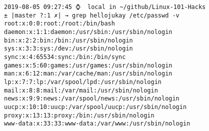 \documentclass[UTF8]{ctexart}
\begin{document}
\begin{lstlisting}
2019-08-05 09:27:45 ⌚  local in ~/github/Linux-101-Hacks                                                                                                                    
± |master ?:1 ✗| → grep hellojukay /etc/passwd -v                                                                                                                             
root:x:0:0:root:/root:/bin/bash                                                                                                                                               
daemon:x:1:1:daemon:/usr/sbin:/usr/sbin/nologin                                                                                                                               
bin:x:2:2:bin:/bin:/usr/sbin/nologin                                                                                                                                          
sys:x:3:3:sys:/dev:/usr/sbin/nologin                                                                                                                                          
sync:x:4:65534:sync:/bin:/bin/sync                                                                                                                                            
games:x:5:60:games:/usr/games:/usr/sbin/nologin                                                                                                                               
man:x:6:12:man:/var/cache/man:/usr/sbin/nologin                                                                                                                               
lp:x:7:7:lp:/var/spool/lpd:/usr/sbin/nologin                                                                                                                                  
mail:x:8:8:mail:/var/mail:/usr/sbin/nologin                                                                                                                                   
news:x:9:9:news:/var/spool/news:/usr/sbin/nologin                                                                                                                             
uucp:x:10:10:uucp:/var/spool/uucp:/usr/sbin/nologin                                                                                                                           
proxy:x:13:13:proxy:/bin:/usr/sbin/nologin                                                                                                                                    
www-data:x:33:33:www-data:/var/www:/usr/sbin/nologin                                                                                                                          

\end{lstlisting}
\end{document}
